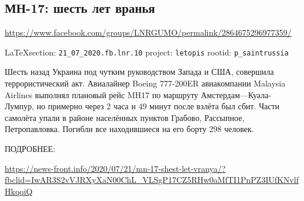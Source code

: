  
 
\subsection{МН-17: шесть лет вранья}
\url{https://www.facebook.com/groups/LNRGUMO/permalink/2864675296977359/}
  
\vspace{0.5cm}
{\small\LaTeX section: \verb|21_07_2020.fb.lnr.10| project: \verb|letopis| rootid: \verb|p_saintrussia|}
\vspace{0.5cm}

 
Шесть назад Украина под чутким руководством Запада и США, совершила террористический акт.
Авиалайнер Boeing 777-200ER авиакомпании Malaysia Airlines выполнял плановый рейс MH17 по маршруту Амстердам—Куала-Лумпур, но примерно через 2 часа и 49 минут после взлёта был сбит.
Части самолёта упали в районе населённых пунктов Грабово, Рассыпное, Петропавловка.
Погибли все находившиеся на его борту 298 человек.

ПОДРОБНЕЕ:

\url{https://news-front.info/2020/07/21/mn-17-shest-let-vranya/?fbclid=IwAR3S2vVJRXyXaN00ChL_VLSgP17CZ5RHw0aMfTI1PnPZ3IUfKNvlfHkqqiQ}
